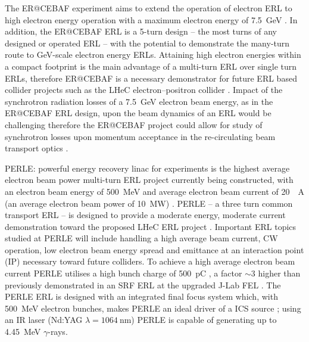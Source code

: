 \documentclass[../main.tex]{subfiles}
\begin{document}
The ER@CEBAF experiment aims to extend the operation of electron ERL to high electron energy operation with a maximum electron energy of 7.5~\si{\giga\electronvolt} \cite{bogacz2016er,meot2016er}. In addition, the ER@CEBAF ERL is a 5-turn design -- the most turns of any designed or operated ERL -- with the potential to demonstrate the many-turn route to \si{\giga\electronvolt}-scale electron energy ERLs. Attaining high electron energies within a compact footprint is the main advantage of a multi-turn ERL over single turn ERLs, therefore ER@CEBAF is a necessary demonstrator for future ERL based collider projects such as the LHeC electron--positron collider \cite{valloni2013strawman,bruning2019exploring,holzer2021accelerator}. Impact of the synchrotron radiation losses of a 7.5~\si{\giga\electronvolt} electron beam energy, as in the ER@CEBAF ERL design, upon the beam dynamics of an ERL would be challenging therefore the ER@CEBAF project could allow for study of synchrotron losses upon momentum acceptance in the re-circulating beam transport optics \cite{adolphsen2022european}.  

PERLE: powerful energy recovery linac for experiments is the highest average electron beam power multi-turn ERL project currently being constructed, with an electron beam energy of 500~\si{\mega\electronvolt} and average electron beam current of 20~\si{\mill\ampere} (an average electron beam power of 10~\si{\mega\watt}) \cite{angal2018perle,bogacz2021perle}. PERLE -- a three turn common transport ERL -- is designed to provide a moderate energy, moderate current demonstration toward the proposed LHeC ERL project \cite{valloni2013strawman,bruning2019exploring,holzer2021accelerator}. Important ERL topics studied at PERLE will include handling a high average beam current, CW operation, low electron beam energy spread and emittance at an interaction point (IP) \cite{adolphsen2022european} necessary toward future colliders. To achieve a high average electron beam current PERLE utilises a high bunch charge of 500~\si{\pico\coulomb} \cite{hounsell2021optimization}, a factor $\sim3$ higher than previously demonstrated in an SRF ERL at the upgraded J-Lab FEL \cite{neil2006jlab}. The PERLE ERL is designed with an integrated final focus system which, with 500~\si{\mega\electronvolt} electron bunches, makes PERLE an ideal driver of a ICS source \cite{adolphsen2022european}; using an IR laser (Nd:YAG $\lambda=1064~\si{\nano\meter}$) PERLE is capable of generating up to 4.45~\si{\mega\electronvolt} $\gamma$-rays.      
\end{document}
